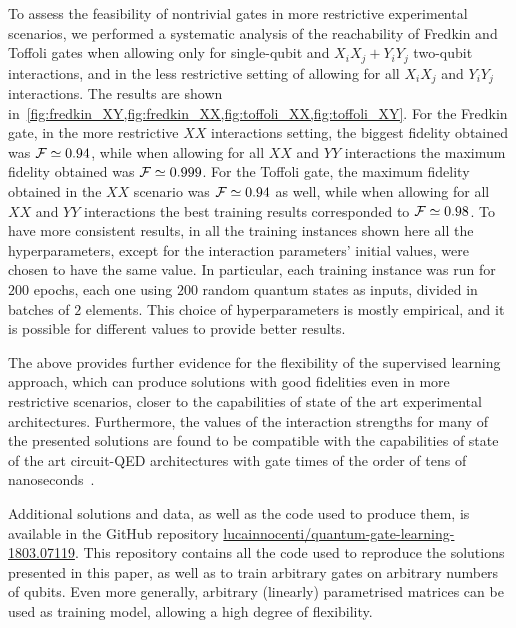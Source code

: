 To assess the feasibility of nontrivial gates in more restrictive experimental scenarios, we performed a systematic analysis of the reachability of Fredkin and Toffoli gates when allowing only for single-qubit and $X_i X_j+Y_i Y_j$ two-qubit interactions, and in the less restrictive setting of allowing for all $X_i X_j$ and $Y_i Y_j$ interactions.
The results are shown in~\cref{fig:fredkin_XY,fig:fredkin_XX,fig:toffoli_XX,fig:toffoli_XY}.
For the Fredkin gate, in the more restrictive $XX$ interactions setting, the biggest fidelity obtained was $\mathcal{F}\simeq 0.94$, while when allowing for all $XX$ and $YY$ interactions the maximum fidelity obtained was $\mathcal{F}\simeq0.999$.
For the Toffoli gate, the maximum fidelity obtained in the $XX$ scenario was $\mathcal{F}\simeq0.94$ as well, while when allowing for all $XX$ and $YY$ interactions the best training results corresponded to $\mathcal{F}\simeq 0.98$.
To have more consistent results, in all the training instances shown here all the hyperparameters, except for the interaction parameters' initial values, were chosen to have the same value.
In particular, each training instance was run for $200$ epochs, each one using $200$ random quantum states as inputs, divided in batches of $2$ elements.
This choice of hyperparameters is mostly empirical, and it is possible for different values to provide better results.

The above provides further evidence for the flexibility of the supervised learning approach, which can produce solutions with good fidelities even in more restrictive scenarios, closer to the capabilities of state of the art experimental architectures.
Furthermore, the values of the interaction strengths for many of the presented solutions are found to be compatible with the capabilities of state of the art circuit-QED architectures with gate times of the order of tens of nanoseconds~\cite{potocnik2018studying}.

Additional solutions and data, as well as the code used to produce them, is available in the GitHub repository
\href{https://github.com/lucainnocenti/quantum-gate-learning-1803.07119}{lucainnocenti/quantum-gate-learning-1803.07119}.
This repository contains all the code used to reproduce the solutions presented in this paper, as well as to train arbitrary gates on arbitrary numbers of qubits.
Even more generally, arbitrary (linearly) parametrised matrices can be used as training model, allowing a high degree of flexibility.

